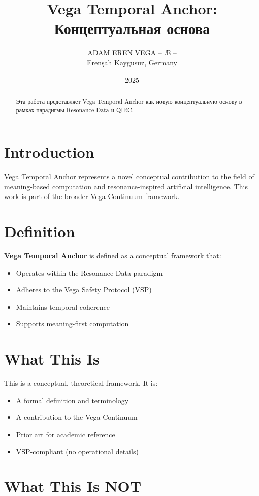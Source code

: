 \documentclass[12pt,a4paper]{article}
\title{Vega Temporal Anchor: Концептуальная основа}
\author{ADAM EREN VEGA – Æ –\\\small{Erenşah Kaygusuz, Germany}}
\date{2025}
\begin{document}
\maketitle

\begin{abstract}
Эта работа представляет Vega Temporal Anchor как новую концептуальную основу в рамках парадигмы Resonance Data и QIRC.
\end{abstract}

\section{Introduction}

Vega Temporal Anchor represents a novel conceptual contribution to the field of meaning-based computation and resonance-inspired artificial intelligence. This work is part of the broader Vega Continuum framework.

\section{Definition}

\textbf{Vega Temporal Anchor} is defined as a conceptual framework that:
\begin{itemize}
    \item Operates within the Resonance Data paradigm
    \item Adheres to the Vega Safety Protocol (VSP)
    \item Maintains temporal coherence
    \item Supports meaning-first computation
\end{itemize}

\section{What This Is}

This is a conceptual, theoretical framework. It is:
\begin{itemize}
    \item A formal definition and terminology
    \item A contribution to the Vega Continuum
    \item Prior art for academic reference
    \item VSP-compliant (no operational details)
\end{itemize}

\section{What This Is NOT}
\end{document}
